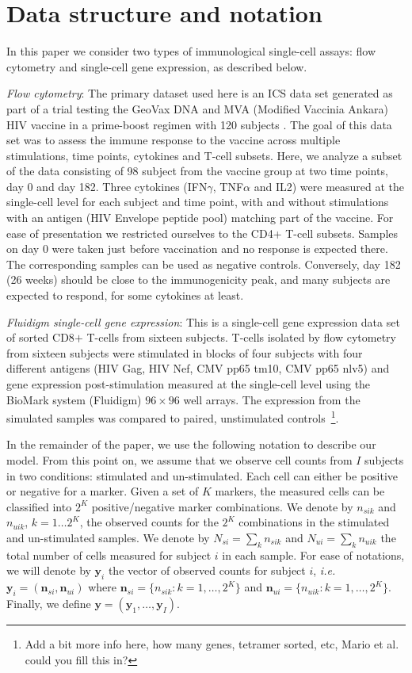 \documentclass[useAMS,referee,usenatbib]{biom}
\begin{document}
\section{Data structure and notation} 
\label{s:data}
In this paper we consider two types of immunological single-cell assays: flow cytometry and single-cell gene expression, as described below.

\textit{Flow cytometry}:
The primary dataset used here is an ICS data set generated as part of a  trial testing the GeoVax DNA and MVA (Modified Vaccinia Ankara) HIV vaccine in a prime-boost regimen with 120 subjects \citep{Goonetilleke:2006jk}. 
The goal of this data set was to assess the immune response to the vaccine across multiple stimulations, time points, cytokines and T-cell subsets. 
Here, we analyze a subset of the data consisting of 98 subject from the vaccine group at two time points, day 0 and day 182. 
Three cytokines (IFN$\gamma$, TNF$\alpha$ and IL2) were measured at the single-cell level for each subject and time point, with and without stimulations with an antigen (HIV Envelope peptide pool) matching part of the vaccine. For ease of presentation we restricted ourselves to the CD4+ T-cell subsets. Samples on day 0 were taken just before vaccination and no response is expected there. The corresponding samples can be used as negative controls. Conversely, day 182 (26 weeks) should be close to the immunogenicity peak, and many subjects are expected to respond, for some cytokines at least. 

\textit{Fluidigm single-cell gene expression}: This is a single-cell gene expression data set of sorted CD8$+$ T-cells from sixteen subjects. T-cells isolated by flow cytometry from sixteen subjects were stimulated in blocks of four subjects with four different antigens (HIV Gag, HIV Nef, CMV pp65 tm10, CMV pp65 nlv5) and gene expression post-stimulation measured at the single-cell level using the BioMark system (Fluidigm) $96 \times 96$ well arrays. The expression from the simulated samples  was compared to paired, unstimulated controls~\footnote{Add a bit more info here, how many genes, tetramer sorted, etc, Mario et al. could you fill this in?}.


In the remainder of the paper, we use the following notation to describe our model.  From this point on, we assume that we observe cell counts from $I$ subjects in two conditions: stimulated and un-stimulated. Each cell can either be positive or negative for a marker. Given a set of $K$ markers, the measured cells can be classified into $2^K$ positive/negative marker combinations. We denote by $n_{sik}$ and $n_{uik}$, $k=1\dots 2^K$, the observed counts for the $2^K$ combinations in the stimulated and un-stimulated samples. We denote by $N_{si}=\sum_k n_{sik}$ and $N_{ui}=\sum_k n_{uik}$ the total number of cells measured for subject $i$ in each sample. For ease of notations, we will denote by $\mathbf{y}_i$ the vector of observed counts for subject $i$, \textit{i.e.} $\mathbf{y}_{i}=(\mathbf{n}_{si}, \mathbf{n}_{ui})$ where $\mathbf{n}_{si}=\{n_{sik}: k=1,\dots,2^K\}$ and $\mathbf{n}_{ui}=\{n_{uik}: k=1,\dots,2^K\}$. Finally, we define $\mathbf{y}=(\mathbf{y}_1,\dots,\mathbf{y}_I)$.
\end{document}

